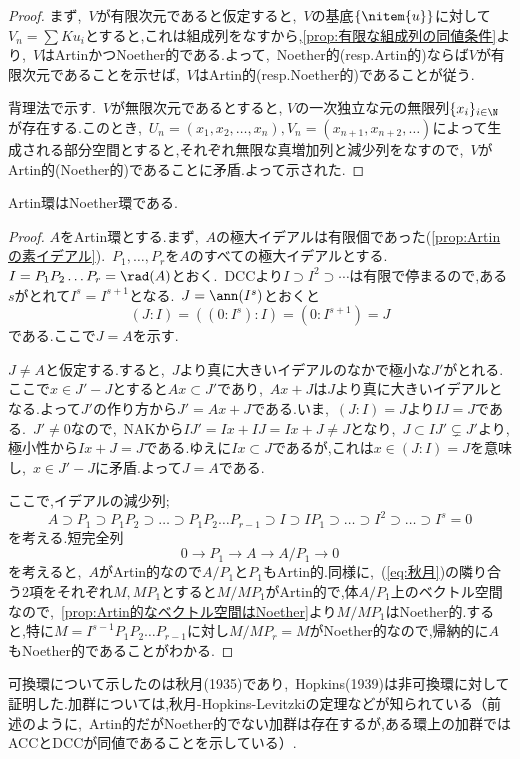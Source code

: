 \begin{proof}
	まず,~$V$が有限次元であると仮定すると,~$V$の基底$\{\nitem{u}\}$に対して$V_n=\sum Ku_i$とすると,これは組成列をなすから,\ref{prop:有限な組成列の同値条件}より,~$V$はArtinかつNoether的である.よって,~Noether的(resp.Artin的)ならば$V$が有限次元であることを示せば,~$V$はArtin的(resp.Noether的)であることが従う.
	
	背理法で示す.~$V$が無限次元であるとすると, $V$の一次独立な元の無限列$\{x_i\}_{i\in\N}$が存在する.このとき,~$U_n=(x_1,x_2,\dots,x_n),V_n=(x_{n+1},x_{n+2},\dots)$によって生成される部分空間とすると,それぞれ無限な真増加列と減少列をなすので,~$V$がArtin的(Noether的)であることに矛盾.よって示された.
\end{proof}
\begin{thm}[秋月,1935]\label{thm:秋月}
	Artin環はNoether環である.
\end{thm}
\begin{proof}
	$A$をArtin環とする.まず,~$A$の極大イデアルは有限個であった(\ref{prop:Artinの素イデアル}).~$ P_1,\dots, P_r$を$A$のすべての極大イデアルとする.~$I= P_1 P_2\dots P_r=\rad(A)$とおく.~DCCより$I\supset I^2\supset\cdots$は有限で停まるので,ある$s$がとれて$I^s=I^{s+1}$となる.~$J=\ann(I^s)$とおくと	
	\[(J:I)=((0:I^s):I)=(0:I^{s+1})=J\]
	である.ここで$J=A$を示す.
	
	$J\neq A$と仮定する.すると,~$J$より真に大きいイデアルのなかで極小な$J'$がとれる.ここで$x\in J'-J$とすると$Ax\subset J'$であり,~$Ax+J$は$J$より真に大きいイデアルとなる.よって$J'$の作り方から$J'=Ax+J$である.いま,~$(J:I)=J$より$IJ=J$である.~$J'\neq 0$なので,~NAKから$IJ'=Ix+IJ=Ix+J\neq J$となり,~$J\subset IJ'\subsetneq J'$より,極小性から$Ix+J=J$である.ゆえに$Ix\subset J$であるが,これは$x\in(J:I)=J$を意味し,~$x\in J'-J$に矛盾.よって$J=A$である.
	
	ここで,イデアルの減少列;\displaystar
	\[\label{eq:秋月}
	A\supset P_1\supset P_1 P_2\supset\dots\supset P_1 P_2\dots P_{r-1}\supset I\supset I P_1\supset\dots\supset I^2\supset\dots\supset I^s=0\]
	を考える.短完全列
	\[0\longrightarrow P_1\longrightarrow A\longrightarrow A/ P_1\longrightarrow 0\]
	を考えると,~$A$がArtin的なので$A/ P_1$と$ P_1$もArtin的.同様に,~(\ref{eq:秋月})の隣り合う2項をそれぞれ$M,M P_1$とすると$M/M P_1$がArtin的で,体$A/ P_1$上のベクトル空間なので,~\ref{prop:Artin的なベクトル空間はNoether}より$M/M P_1$はNoether的.すると,特に$M=I^{s-1} P_1 P_2\dots P_{r-1}$に対し$M/M P_r=M$がNoether的なので,帰納的に$A$もNoether的であることがわかる.
\end{proof}

可換環について示したのは秋月(1935)であり,~Hopkins(1939)は非可換環に対して証明した.加群については,秋月-Hopkins-Levitzkiの定理などが知られている（前述のように,~Artin的だがNoether的でない加群は存在するが,ある環上の加群ではACCとDCCが同値であることを示している）.

